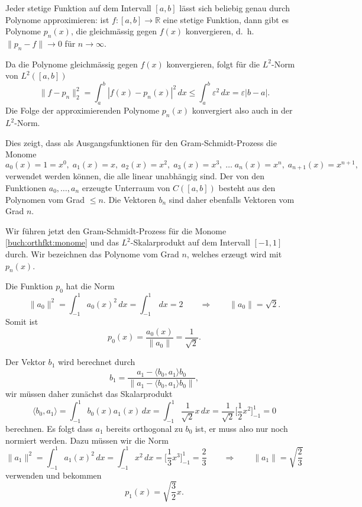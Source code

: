 \begin{satz}[Weierstrass]
Jeder stetige Funktion auf dem Intervall $[a,b]$ lässt sich beliebig
genau durch Polynome approximieren: ist $f\colon [a,b]\to\mathbb{R}$
eine stetige Funktion, dann gibt es Polynome $p_n(x)$, die gleichmässig
gegen $f(x)$ konvergieren, d.~h.~\(
\|p_n-f\| \to 0
\)
für $n\to\infty$.
\end{satz}

Da die Polynome gleichmässig gegen $f(x)$ konvergieren, folgt für die
$L^2$-Norm von $L^2([a,b])$
\[
\| f-p_n \|_2^2
=
\int_a^b |f(x)-p_n(x)|^2\,dx
\le 
\int_a^b \varepsilon^2 \,dx
=
\varepsilon |b-a|.
\]
Die Folge der approximierenden Polynome $p_n(x)$ konvergiert also
auch in der $L^2$-Norm.

Dies zeigt, dass als Ausgangsfunktionen für den Gram-Schmidt-Prozess
die Monome
\begin{equation}
a_0(x)=1=x^0,\;
a_1(x)=x,\;
a_2(x)=x^2,\;
a_3(x)=x^3,\;
\ldots\;
a_n(x)=x^n,\;
a_{n+1}(x)=x^{n+1},\;
\label{buch:orthfkt:monome}
\end{equation}
verwendet werden können, die alle linear unabhängig sind.
Der von den Funktionen $a_0,\dots,a_n$ erzeugte Unterraum von
$C([a,b])$ besteht aus den Polynomen vom Grad $\le n$.
Die Vektoren $b_n$ sind daher ebenfalls Vektoren vom Grad $n$.

Wir führen jetzt den Gram-Schmidt-Prozess für die Monome
\eqref{buch:orthfkt:monome}
und das $L^2$-Skalarprodukt auf dem Intervall $[-1,1]$ durch.
Wir bezeichnen das Polynome vom Grad $n$, welches erzeugt wird mit $p_n(x)$.

Die Funktion $p_0$ hat die Norm
\[
\|a_0\|^2
=
\int_{-1}^1 a_0(x)^2\,dx
=
\int_{-1}^1 \,dx
=
2
\qquad\Rightarrow\qquad
\|a_0\| = \!\sqrt{2}.
\]
Somit ist
\[
p_0(x) = \frac{a_0(x)}{\|a_0\|} = \frac{1}{\!\sqrt{2}}.
\]

Der Vektor $b_1$ wird berechnet durch
\[
b_1
=
\frac{
a_1-\langle b_0,a_1\rangle b_0
}{
\|
a_1-\langle b_0,a_1\rangle b_0
\|
},
\]
wir müssen daher zunächst das Skalarprodukt
\[
\langle b_0,a_1\rangle
=
\int_{-1}^1 b_0(x)a_1(x)\,dx
=
\int_{-1}^1 \frac{1}{\!\sqrt{2}} x\,dx
=
\frac{1}{\!\sqrt{2}} \biggl[\frac12x^2\biggr]_{-1}^1=0
\]
berechnen.
Es folgt dass $a_1$ bereits orthogonal zu $b_0$ ist, er muss also
nur noch normiert werden.
Dazu müssen wir die Norm
\[
\| a_1\|^2
=
\int_{-1}^1 a_1(x)^2\,dx
=
\int_{-1}^1 x^2\,dx
=
\biggl[\frac13x^3\biggr]_{-1}^1
=
\frac{2}{3}
\qquad\Rightarrow\qquad
\|a_1\|
=
\!\sqrt{\frac{2}{3}}
\]
verwenden und bekommen
\[
p_1(x) = \!\sqrt{\frac{3}{2}} x.
\]

